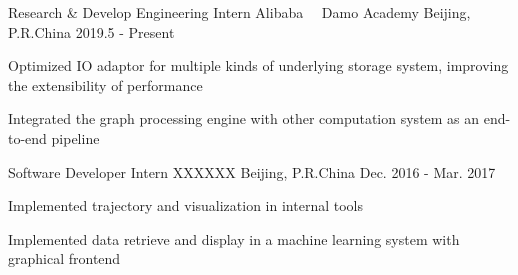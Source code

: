 


\begin{cventries}

\cventry
{Research \& Develop Engineering Intern} %
{Alibaba \ \textbullet\  Damo Academy} %
{Beijing, P.R.China} %
{2019.5 - Present} %
{ %
    \begin{cvitems}
        \item {Optimized IO adaptor for multiple kinds of underlying storage system, improving the extensibility of performance}
        \item {Integrated the graph processing engine with other computation system as an end-to-end pipeline}
    \end{cvitems}
}

\vspace{-5mm}

\cventry
{Software Developer Intern} %
{XXXXXX} %
{Beijing, P.R.China} %
{Dec. 2016 - Mar. 2017} %
{ %
	\begin{cvitems}
		\item {Implemented trajectory and visualization in internal tools}
		\item {Implemented data retrieve and display in a machine learning system with graphical frontend}
	\end{cvitems}
}

\end{cventries}
